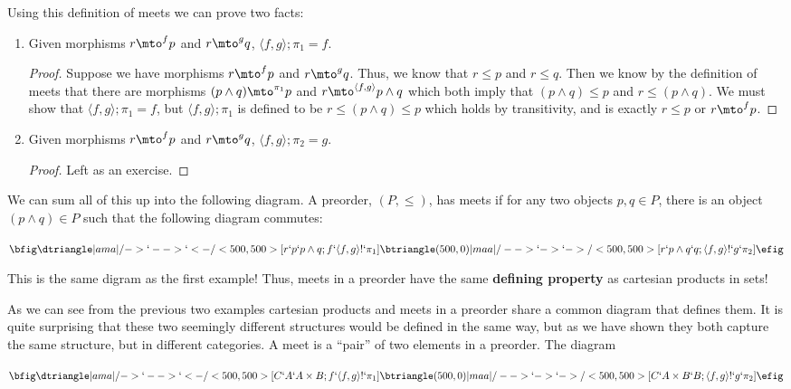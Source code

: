 \begin{itemize}
  Using this definition of meets we can prove two facts:
  \begin{enumerate}
  \item Given morphisms $r \mto^f p$ and $r \mto^g q$, $\langle f,g \rangle;\pi_1 = f$.
    \begin{proof}
      Suppose we have morphisms $r \mto^f p$ and $r \mto^g q$.  Thus,
      we know that $r \leq p$ and $r \leq q$.  Then we know by the
      definition of meets that there are morphisms $(p \land q)
      \mto^{\pi_1} p$ and $r \mto^{\langle f,g \rangle} p \land q$
      which both imply that $(p\land q) \leq p$ and $r \leq (p\land
      q)$.  We must show that $\langle f,g \rangle;\pi_1 = f$, but
      $\langle f,g \rangle;\pi_1$ is defined to be $r \leq (p \land q)
      \leq p$ which holds by transitivity, and is exactly $r \leq p$ or $r \mto^f p$.
    \end{proof}
    \item Given morphisms $r \mto^f p$ and $r \mto^g q$, $\langle f,g \rangle;\pi_2 = g$.
    \begin{proof}
      Left as an exercise.
    \end{proof}
  \end{enumerate}
  We can sum all of this up into the following diagram.  A preorder,
  $(P,\leq)$, has meets if for any two objects $p,q \in P$, there is
  an object $(p \land q) \in P$ such that the following diagram commutes:
  \begin{center}
    \begin{math}
      \bfig
      \dtriangle|ama|/->`-->`<-/<500,500>[r`p`p \land q;f`\langle f,g \rangle!`\pi_1]
      \btriangle(500,0)|maa|/-->`->`->/<500,500>[r`p \land q`q;\langle f,g \rangle!`g`\pi_2]
      \efig
    \end{math}
  \end{center}
  This is the same digram as the first example!  Thus, meets in a
  preorder have the same \textbf{defining property} as cartesian
  products in sets!
\end{itemize}
As we can see from the previous two examples cartesian products and
meets in a preorder share a common diagram that defines them. It is
quite surprising that these two seemingly different structures would
be defined in the same way, but as we have shown they both capture the
same structure, but in different categories.  A meet is a ``pair'' of
two elements in a preorder. The diagram
\begin{center}
  \begin{math}
    \bfig
    \dtriangle|ama|/->`-->`<-/<500,500>[C`A`A \times B;f`\langle f,g \rangle!`\pi_1]
    \btriangle(500,0)|maa|/-->`->`->/<500,500>[C`A \times B`B;\langle f,g \rangle!`g`\pi_2]
    \efig
  \end{math}
\end{center}
